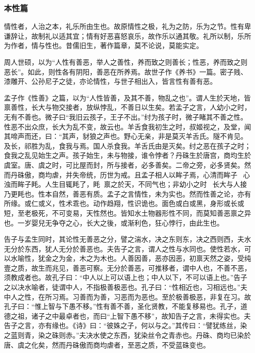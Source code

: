 \documentclass[]{article}
\begin{document}
\hypertarget{header-n119}{%
\subsubsection{本性篇}\label{header-n119}}

情性者，人治之本，礼乐所由生也。故原情性之极，礼为之防，乐为之节。性有卑谦辞让，故制礼以适其宜；情有好恶喜怒哀乐，故作乐以通其敬。礼所以制，乐所为作者，情与性也。昔儒旧生，著作篇章，莫不论说，莫能实定。

周人世硕，以为``人性有善恶，举人之善性，养而致之则善长；性恶，养而致之则恶长''。如此，则性各有阴阳，善恶在所养焉。故世子作《养书》一篇。密子贱、漆雕开、公孙尼子之徒，亦论情性，与世子相出入，皆言性有善有恶。

孟子作《性善》之篇，以为``人性皆善，及其不善，物乱之也''。谓人生於天地，皆禀善性，长大与物交接者，放纵悖乱，不善日以生矣。若孟子之言，人幼小之时，无有不善也。微子曰``我旧云孩子，王子不出。''纣为孩子时，微子睹其不善之性。性恶不出众庶，长大为乱不变，故云也。羊舌食我初生之时，叔姬视之，及堂，闻其啼声而还，曰：``其声，豺狼之声也。野心无亲，非是莫灭羊舌氏。隧不肯见。及长，祁胜为乱，食我与焉。国人杀食我。羊舌氏由是灭矣。纣之恶在孩子之时；食我之乱见始生之声。孩子始生，未与物接，谁令悖者？丹硃生於唐宫，商均生於虞室。唐、虞之时，可比屋而封，所与接者，必多善矣。二帝之旁，必多贤矣。然而丹硃傲，商均虐，并失帝统，历世为戒。且孟子相人以眸子焉，心清而眸子，心浊而眸子眊。人生目辄眊了，眊禀之於天，不同气也；非幼小之时，长大与人接乃更眊也。性本自然，善恶有质。孟子之言情性，未为实也。然而性善之论，亦有所缘。或仁或义，性术乖也。动作趋翔，性识诡也。面色或白或黑，身形或长或短，至老极死，不可变易，天性然也。皆知水土物器形性不同，而莫知善恶禀之异也。一岁婴兒无争夺之心，长大之後，或渐利色，狂心悖行，由此生也。

告子与孟生同时，其论性无善恶之分，譬之湍水，决之东则东，决之西则西，夫水无分於东西，犹人无分於善恶也。夫告子之言，谓人之性与水同也。使性若水，可以水喻性，犹金之为金，木之为木也。人善因善，恶亦因恶，初禀天然之姿，受纯壹之质，故生而兆见，善恶可察。无分於善恶，可推移者，谓中人也，不善不恶，须教成者也。故孔子曰：``中人以上可以语上也；中人以下，不可以语上也。''告子之以决水喻者，徒谓中人，不指极善极恶也。孔子曰：``性相近也，习相远也。''夫中人之性，在所习焉。习善而为善，习恶而为恶也。至於极善极恶，非复在习。故孔子曰：``惟上智与下愚不移。''性有善不善，圣化贤教，不能复移易也。孔子，道德之祖，诸子之中最卓者也，而曰``上智下愚不移''，故知告子之言，未得实也。夫告子之言，亦有缘也。《诗》曰：``彼姝之子，何以与之。''其传曰：``譬犹练丝，染之蓝则青，染之硃则赤。''夫决水使之东西，犹染丝令之青赤也。丹硃、商均已染於唐、虞之化矣，然而丹硃傲而商均虐者，至恶之质，不受蓝硃变也。
\end{document}
